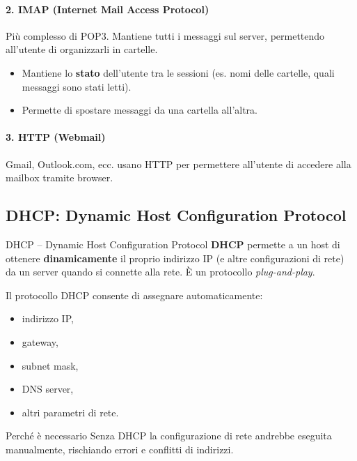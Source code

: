 \documentclass[a4paper,12pt]{report}
\begin{document}
\vspace{1cm}
\paragraph{2. IMAP (Internet Mail Access Protocol)}
Più complesso di POP3. Mantiene tutti i messaggi sul server, permettendo all'utente di organizzarli in cartelle.
\begin{itemize}
    \item Mantiene lo \textbf{stato} dell'utente tra le sessioni (es. nomi delle cartelle, quali messaggi sono stati letti).
    \item Permette di spostare messaggi da una cartella all'altra.
\end{itemize}

\vspace{1cm}
\paragraph{3. HTTP (Webmail)}
Gmail, Outlook.com, ecc. usano HTTP per permettere all'utente di accedere alla mailbox tramite browser.

\newpage
\subsection{DHCP: Dynamic Host Configuration Protocol}
\label{sec:DHCP}


\begin{defbox}{DHCP -- Dynamic Host Configuration Protocol}
\textbf{DHCP} permette a un host di ottenere \textbf{dinamicamente} il
proprio indirizzo IP (e altre configurazioni di rete) da un server quando
si connette alla rete. È un protocollo \textit{plug-and-play}.
\end{defbox}
Il protocollo DHCP consente di assegnare automaticamente:
\begin{itemize}
    \item indirizzo IP,
    \item gateway,
    \item subnet mask,
    \item DNS server,
    \item altri parametri di rete.
\end{itemize}

\begin{notebox}{Perché è necessario}
Senza DHCP la configurazione di rete andrebbe eseguita manualmente,
rischiando errori e conflitti di indirizzi.
\end{notebox}
\end{document}
